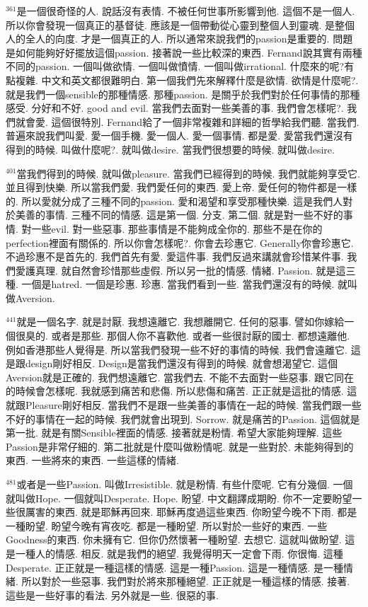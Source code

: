 \documentclass{book}
\begin{document}
$^{361}$是一個很奇怪的人.
說話沒有表情.
不被任何世事所影響到他.
這個不是一個人.
所以你會發現一個真正的基督徒.
應該是一個帶動從心靈到整個人到靈魂.
是整個人的全人的向度.
才是一個真正的人.
所以通常來說我們的passion是重要的.
問題是如何能夠好好擺放這個passion.
接著說一些比較深的東西.
Fernand說其實有兩種不同的passion.
一個叫做欲情.
一個叫做憤情.
一個叫做irrational.
什麼來的呢?有點複雜.
中文和英文都很難明白.
第一個我們先來解釋什麼是欲情.
欲情是什麼呢?.
就是我們一個sensible的那種情感.
那種passion.
是關乎於我們對於任何事情的那種感受.
分好和不好.
good and evil.
當我們去面對一些美善的事.
我們會怎樣呢?.
我們就會愛.
這個很特別.
Fernand給了一個非常複雜和詳細的哲學給我們聽.
當我們.
普遍來說我們叫愛.
愛一個手機.
愛一個人.
愛一個事情.
都是愛.
愛當我們還沒有得到的時候.
叫做什麼呢?.
就叫做desire.
當我們很想要的時候.
就叫做desire.

$^{401}$當我們得到的時候.
就叫做pleasure.
當我們已經得到的時候.
我們就能夠享受它.
並且得到快樂.
所以當我們愛.
我們愛任何的東西.
愛上帝.
愛任何的物件都是一樣的.
所以愛就分成了三種不同的passion.
愛和渴望和享受那種快樂.
這是我們人對於美善的事情.
三種不同的情感.
這是第一個.
分支.
第二個.
就是對一些不好的事情.
對一些evil.
對一些惡事.
那些事情是不能夠成全你的.
那些不是在你的perfection裡面有關係的.
所以你會怎樣呢?.
你會去珍惠它.
Generally你會珍惠它.
不過珍惠不是首先的.
我們首先有愛.
愛這件事.
我們反過來講就會珍惜某件事.
我們愛護真理.
就自然會珍惜那些虛假.
所以另一批的情感.
情緒.
Passion.
就是這三種.
一個是hatred.
一個是珍惠.
珍惠.
當我們看到一些.
當我們還沒有的時候.
就叫做Aversion.

$^{441}$就是一個名字.
就是討厭.
我想遠離它.
我想離開它.
任何的惡事.
譬如你嫁給一個很臭的.
或者是那些.
那個人你不喜歡他.
或者一些很討厭的國士.
都想遠離他.
例如香港那些人覺得是.
所以當我們發現一些不好的事情的時候.
我們會遠離它.
這是跟design剛好相反.
Design是當我們還沒有得到的時候.
就會想渴望它.
這個Aversion就是正確的.
我們想遠離它.
當我們去.
不能不去面對一些惡事.
跟它同在的時候會怎樣呢.
我就感到痛苦和悲傷.
所以悲傷和痛苦.
正正就是這批的情感.
這就跟Pleasure剛好相反.
當我們不是跟一些美善的事情在一起的時候.
當我們跟一些不好的事情在一起的時候.
我們就會出現到.
Sorrow.
就是痛苦的Passion.
這個就是第一批.
就是有關Sensible裡面的情感.
接著就是粉情.
希望大家能夠理解.
這些Passion是非常仔細的.
第二批就是什麼叫做粉情呢.
就是一些對於.
未能夠得到的東西.
一些將來的東西.
一些這樣的情緒.

$^{481}$或者是一些Passion.
叫做Irresistible.
就是粉情.
有些什麼呢.
它有分幾個.
一個就叫做Hope.
一個就叫Desperate.
Hope.
盼望.
中文翻譯成期盼.
你不一定要盼望一些很厲害的東西.
就是耶穌再回來.
耶穌再度過這些東西.
你盼望今晚不下雨.
都是一種盼望.
盼望今晚有宵夜吃.
都是一種盼望.
所以對於一些好的東西.
一些Goodness的東西.
你未擁有它.
但你仍然懷著一種盼望.
去想它.
這就叫做盼望.
這是一種人的情感.
相反.
就是我們的絕望.
我覺得明天一定會下雨.
你很悔.
這種Desperate.
正正就是一種這樣的情感.
這是一種Passion.
這是一種情感.
是一種情緒.
所以對於一些惡事.
我們對於將來那種絕望.
正正就是一種這樣的情感.
接著.
這些是一些好事的看法.
另外就是一些.
很惡的事.
\end{document}
